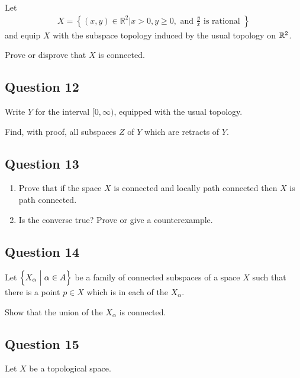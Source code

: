 \documentclass[12pt]{article}
\begin{document}
Let \begin{align*}
X=\left\{(x, y) \in \mathbb{R}^{2} | x>0, y \geq 0, \text { and } \frac{y}{x} \text { is rational }\right\}
\end{align*} and equip \(X\) with the subspace topology induced by the
usual topology on \({\mathbb{R}}^2\).

Prove or disprove that \(X\) is connected.

\hypertarget{question-12-3}{%
\subsection{Question 12}\label{question-12-3}}

Write \(Y\) for the interval \([0, \infty)\), equipped with the usual
topology.

Find, with proof, all subspaces \(Z\) of \(Y\) which are retracts of
\(Y\).

\hypertarget{question-13-3}{%
\subsection{Question 13}\label{question-13-3}}

\begin{enumerate}
\def\labelenumi{\alph{enumi}.}
\item
  Prove that if the space \(X\) is connected and locally path connected
  then \(X\) is path connected.
\item
  Is the converse true? Prove or give a counterexample.
\end{enumerate}

\hypertarget{question-14-3}{%
\subsection{Question 14}\label{question-14-3}}

Let \(\left\{{X_\alpha \mathrel{\Big|} \alpha \in A}\right\}\) be a family of connected
subspaces of a space \(X\) such that there is a point \(p \in X\) which
is in each of the \(X_\alpha\).

Show that the union of the \(X_\alpha\) is connected.

\hypertarget{question-15-3}{%
\subsection{Question 15}\label{question-15-3}}

Let \(X\) be a topological space.
\end{document}
